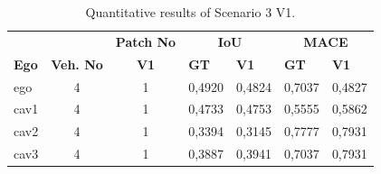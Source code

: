 \begin{table}[tph]
    \centering
    \caption{Quantitative results of Scenario 3 V1.}
    \label{tab:scenario3v1_results}
    \begin{tabularx}{\textwidth}{l c c *{4}{X}}
        \toprule
                         &             & \multicolumn{1}{c}{\textbf{Patch No}} & \multicolumn{2}{c}{\textbf{IoU}} & \multicolumn{2}{c}{\textbf{MACE}}                   \\
        \cmidrule(lr){4-5}\cmidrule(lr){6-7}
        \textbf{Ego}     &
        \textbf{Veh. No} &
        \textbf{V1}      &
        \textbf{GT}      & \textbf{V1} &
        \textbf{GT}      & \textbf{V1}                                                                                                                                  \\
        \midrule
        ego              & 4           & 1                                     & 0,4920                           & 0,4824                            & 0,7037 & 0,4827 \\
        cav1             & 4           & 1                                     & 0,4733                           & 0,4753                            & 0,5555 & 0,5862 \\
        cav2             & 4           & 1                                     & 0,3394                           & 0,3145                            & 0,7777 & 0,7931 \\
        cav3             & 4           & 1                                     & 0,3887                           & 0,3941                            & 0,7037 & 0,7931 \\
        \bottomrule
    \end{tabularx}
\end{table}
